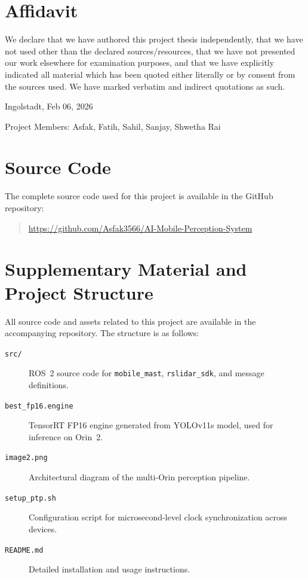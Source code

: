 \documentclass[12pt,a4paper]{report}
\begin{document}
\clearpage
\chapter*{Affidavit}

We declare that we have authored this project thesis independently, that we have not used other than the declared sources/resources, that we have not presented our work elsewhere for examination purposes, and that we have explicitly indicated all material which has been quoted either literally or by consent from the sources used. We have marked verbatim and indirect quotations as such.

\vspace{1cm}

Ingolstadt, Feb 06, 2026

\vspace{0.5cm}

Project Members: Asfak, Fatih, Sahil, Sanjay, Shwetha Rai

\clearpage
\appendix

\chapter{Source Code}
The complete source code used for this project is available in the GitHub repository:
\begin{quote}
\url{https://github.com/Asfak3566/AI-Mobile-Perception-System}
\end{quote}

\chapter{Supplementary Material and Project Structure}
All source code and assets related to this project are available in the accompanying repository. The structure is as follows:

\begin{description}
    \item[\texttt{src/}] ROS~2 source code for \texttt{mobile\_mast}, \texttt{rslidar\_sdk}, and message definitions.
    \item[\texttt{best\_fp16.engine}] TensorRT FP16 engine generated from YOLOv11s model, used for inference on Orin~2.
    \item[\texttt{image2.png}] Architectural diagram of the multi-Orin perception pipeline.
    \item[\texttt{setup\_ptp.sh}] Configuration script for microsecond-level clock synchronization across devices.
    \item[\texttt{README.md}] Detailed installation and usage instructions.
\end{description}
\end{document}
